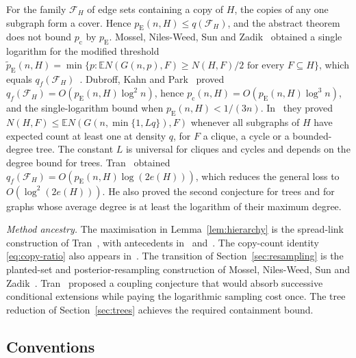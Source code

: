 \documentclass[11pt]{article}
\numberwithin{equation}{section}
\newcommand{\EE}{\mathbb E}
\newcommand{\pc}{p_{\mathrm c}}
\newcommand{\pE}{p_{\mathrm E}}
\begin{document}
For the family $\mathcal F_H$ of edge sets containing a copy of $H$,
the copies of any one subgraph form a cover. Hence
$\pE(n,H)\le q(\mathcal F_H)$, and the abstract theorem does not bound
$\pc$ by $\pE$. Mossel, Niles-Weed, Sun and
Zadik~\cite[Theorem~1]{MNSZ22} obtained a single logarithm for the
modified threshold
$\widetilde p_{\mathrm E}(n,H)=\min\{p:\EE N(G(n,p),F)\ge N(H,F)/2
\text{ for every }F\subseteq H\}$, which equals
$q_f(\mathcal F_H)$~\cite[Equation~(1)]{DKP25}. Dubroff, Kahn and
Park~\cite[Theorems~1.2--1.5]{DKP25} proved
$q_f(\mathcal F_H)=O(\pE(n,H)\log^2n)$, hence
$\pc(n,H)=O(\pE(n,H)\log^3n)$, and the single-logarithm bound when
$\pE(n,H)<1/(3n)$. In~\cite[Theorems~1.4--1.5]{DKP25Cases} they proved
$N(H,F)\le\EE N(G(n,\min\{1,Lq\}),F)$ whenever all subgraphs of $H$
have expected count at least one at density $q$, for $F$ a clique, a
cycle or a bounded-degree tree. The constant $L$ is universal for
cliques and cycles and depends on the degree bound for trees.
Tran~\cite{Tran26} obtained
$q_f(\mathcal F_H)=O(\pE(n,H)\log(2e(H)))$, which reduces the general
loss to $O(\log^2(2e(H)))$. He also proved the second conjecture for
trees and for graphs whose average degree is at least the logarithm of
their maximum degree.

\emph{Method ancestry.} The maximisation in Lemma~\ref{lem:hierarchy}
is the spread-link construction of
Tran~\cite[Section~3, Lemma~3.1]{Tran26}, with antecedents
in~\cite[Claim~29]{LSZ19} and~\cite[Lemma~2.4]{ALWZ21}. The copy-count
identity \eqref{eq:copy-ratio} also appears
in~\cite[Equation~(5)]{MNSZ22}. The transition of
Section~\ref{sec:resampling} is the planted-set and
posterior-resampling construction of Mossel, Niles-Weed, Sun and
Zadik~\cite[Sections~2.1--2.3]{MNSZ25}. Tran~\cite[Section~4]{Tran26}
proposed a coupling conjecture that would absorb successive conditional
extensions while paying the logarithmic sampling cost once. The tree
reduction of Section~\ref{sec:trees} achieves the required containment
bound.

\subsection{Conventions}\label{sec:conventions}
\end{document}
